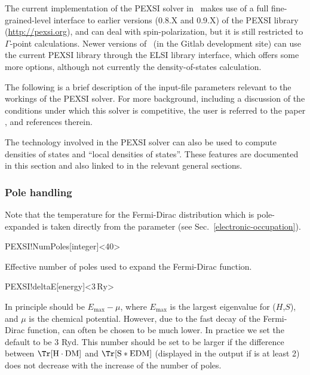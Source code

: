 The current implementation of the PEXSI solver in \siesta\ makes use
of a full fine-grained-level interface to earlier versions (0.8.X and
0.9.X) of the PEXSI library (\url{http://pexsi.org}), and can deal
with spin-polarization, but it is still restricted to $\Gamma$-point
calculations.  Newer versions of \siesta\ (in the Gitlab development
site) can use the current PEXSI library through the ELSI library
interface, which offers some more options, although not currently the
density-of-states calculation.


The following is a brief description of the input-file parameters
relevant to the workings of the PEXSI solver. For more background,
including a discussion of the conditions under which this solver is
competitive, the user is referred to the paper \citet{Lin2014}, and
references therein.

The technology involved in the PEXSI solver can also be used
to compute densities of states and ``local densities of
states''. These features are documented in this section and also
linked to in the relevant general sections.

\subsubsection{Pole handling}

Note that the temperature for the Fermi-Dirac distribution which is
pole-expanded is taken directly from the 
parameter (see Sec.~\ref{electronic-occupation}).

\begin{fdfentry}{PEXSI!NumPoles}[integer]<40>

  Effective number of poles used to expand the Fermi-Dirac function.
  
\end{fdfentry}

\begin{fdfentry}{PEXSI!deltaE}[energy]<$3\,\mathrm{Ry}$>
  
  In principle  should be $E_{\max}-\mu$, where
  $E_{\max}$ is the largest eigenvalue for ($H$,$S$), and $\mu$ is the
  chemical potential. However, due to the fast decay of the
  Fermi-Dirac function,  can often be chosen to be
  much lower.  In practice we set the default to be 3 Ryd.  This
  number should be set to be larger if the difference between
  $\Tr[\mathrm H\cdot\mathrm{DM}]$ and $\Tr[\mathrm S*\mathrm{EDM}]$
  (displayed in the output if  is at least 2)
  does not decrease with the increase of the number of poles.

\end{fdfentry}


